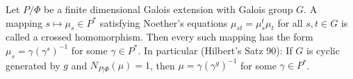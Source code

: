 Let $P/\Phi$ be a finite dimensional Galois extension with Galois group $G$. A mapping $s \mapsto \mu_s \in P^*$ satisfying Noether's equations $\mu_{st} = \mu_s^t \mu_t$ for all $s, t \in G$ is called a crossed homomorphism. Then every such mapping has the form $\mu_s = \gamma(\gamma^s)^{-1}$ for some $\gamma \in P^*$. In particular (Hilbert's Satz 90): If $G$ is cyclic generated by $g$ and $N_{P|\Phi}(\mu) = 1$, then $\mu = \gamma(\gamma^g)^{-1}$ for some $\gamma \in P^*$.
